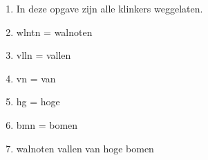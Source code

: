 \begin{enumerate}
  \item In deze opgave zijn alle klinkers weggelaten.
  \item wlntn = walnoten
  \item vlln = vallen
  \item vn = van
  \item hg = hoge
  \item bmn = bomen
  \item walnoten vallen van hoge bomen
\end{enumerate}
